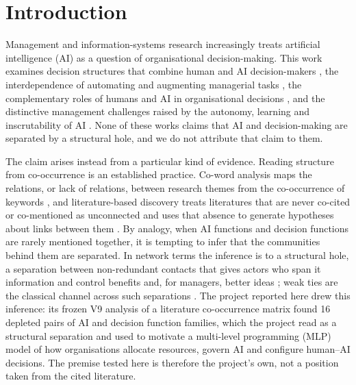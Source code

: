 
\section{Introduction}
\label{sec:intro}

Management and information-systems research increasingly treats artificial intelligence (AI) as a question of organisational decision-making. This work examines decision structures that combine human and AI decision-makers \citep{shrestha2019organizational}, the interdependence of automating and augmenting managerial tasks \citep{raisch2021artificial}, the complementary roles of humans and AI in organisational decisions \citep{jarrahi2018artificial}, and the distinctive management challenges raised by the autonomy, learning and inscrutability of AI \citep{berente2021managing}. None of these works claims that AI and decision-making are separated by a structural hole, and we do not attribute that claim to them.

The claim arises instead from a particular kind of evidence. Reading structure from co-occurrence is an established practice. Co-word analysis maps the relations, or lack of relations, between research themes from the co-occurrence of keywords \citep{callon1983translations}, and literature-based discovery treats literatures that are never co-cited or co-mentioned as unconnected and uses that absence to generate hypotheses about links between them \citep{swanson1986fish}. By analogy, when AI functions and decision functions are rarely mentioned together, it is tempting to infer that the communities behind them are separated. In network terms the inference is to a structural hole, a separation between non-redundant contacts that gives actors who span it information and control benefits \citep{burt1992structural} and, for managers, better ideas \citep{burt2004structural}; weak ties are the classical channel across such separations \citep{granovetter1973strength}. The project reported here drew this inference: its frozen V9 analysis of a literature co-occurrence matrix found 16 depleted pairs of AI and decision function families, which the project read as a structural separation and used to motivate a multi-level programming (MLP) model of how organisations allocate resources, govern AI and configure human--AI decisions. The premise tested here is therefore the project's own, not a position taken from the cited literature.

